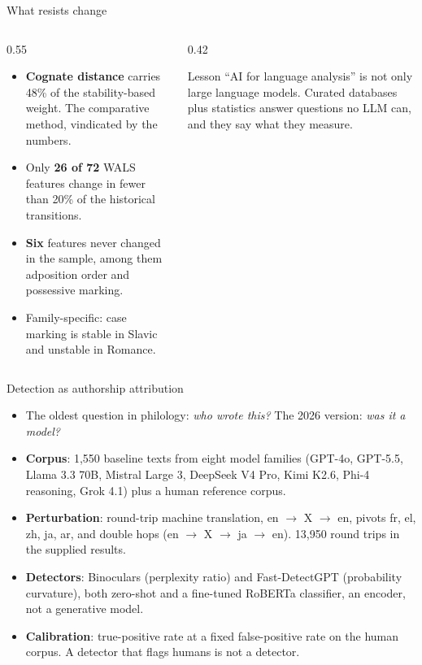 \documentclass[aspectratio=169, 10pt]{beamer}
\newcommand{\key}[1]{\textcolor{aegean}{\textbf{#1}}}
\begin{document}
\begin{frame}{What resists change}
  \begin{columns}[T]
    \begin{column}{0.55\textwidth}
      \begin{itemize}
        \item \key{Cognate distance} carries 48\% of the stability-based weight. The comparative method, vindicated by the numbers.
        \item Only \key{26 of 72} WALS features change in fewer than 20\% of the historical transitions.
        \item \key{Six} features never changed in the sample, among them adposition order and possessive marking.
        \item Family-specific: case marking is stable in Slavic and unstable in Romance.
      \end{itemize}
    \end{column}
    \begin{column}{0.42\textwidth}
      \begin{block}{Lesson}
        ``AI for language analysis'' is not only large language models. Curated databases plus statistics answer questions no LLM can, and they say what they measure.
      \end{block}
    \end{column}
  \end{columns}
\end{frame}

\begin{frame}{Detection as authorship attribution}
  \begin{itemize}
    \item The oldest question in philology: \emph{who wrote this?} The 2026 version: \emph{was it a model?}
    \item \key{Corpus}: 1,550 baseline texts from eight model families (GPT-4o, GPT-5.5, Llama 3.3 70B, Mistral Large 3, DeepSeek V4 Pro, Kimi K2.6, Phi-4 reasoning, Grok 4.1) plus a human reference corpus.
    \item \key{Perturbation}: round-trip machine translation, en $\rightarrow$ X $\rightarrow$ en, pivots fr, el, zh, ja, ar, and double hops (en $\rightarrow$ X $\rightarrow$ ja $\rightarrow$ en). 13,950 round trips in the supplied results.
    \item \key{Detectors}: Binoculars (perplexity ratio) and Fast-DetectGPT (probability curvature), both zero-shot and a fine-tuned RoBERTa classifier, an encoder, not a generative model.
    \item \key{Calibration}: true-positive rate at a fixed false-positive rate on the human corpus. A detector that flags humans is not a detector.
  \end{itemize}
\end{frame}
\end{document}
